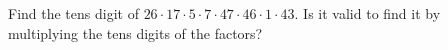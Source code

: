 Find the tens digit of $26\cdot17\cdot5\cdot7\cdot47\cdot46\cdot1\cdot43$. Is it valid to find it by multiplying the tens digits of the factors?
